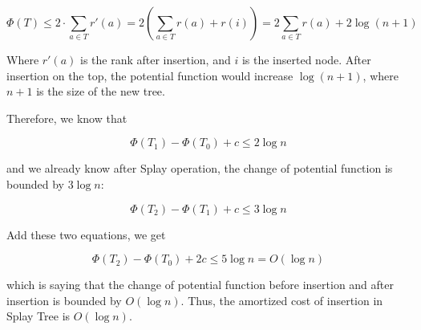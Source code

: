 \[ \Phi(T) \leq 2 \cdot \sum_{a\in T}r'(a) = 2(\sum_{a\in T}r(a)+r(i)) = 2\sum_{a\in T}r(a)+2 \log (n+1) \]

Where $r'(a)$ is the rank after insertion, and $i$ is the inserted node.  After insertion on the top, the potential function would increase $\log(n+1)$, where $n+1$ is the size of the new tree.

Therefore, we know that

\[ \Phi(T_1) - \Phi(T_0) + c \leq 2\log n \]

and we already know after Splay operation, the change of potential function is bounded by $3\log n$:

\[ \Phi(T_2) - \Phi(T_1) + c \leq 3\log n \]

Add these two equations, we get

\[ \Phi(T_2) - \Phi(T_0) + 2c \leq 5\log n = O(\log n) \]

which is saying that the change of potential function before insertion and after insertion is bounded by $O(\log n)$.  Thus, the amortized cost of insertion in Splay Tree is $O(\log n)$.

